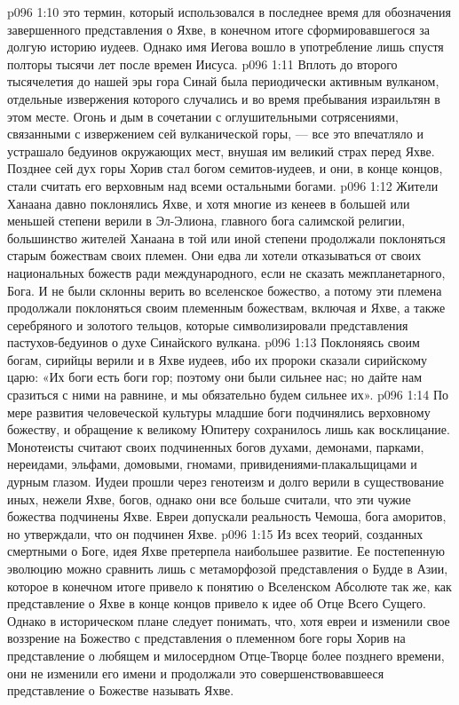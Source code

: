 \vs p096 1:10 \pc {} это термин, который использовался в последнее время для обозначения завершенного представления о Яхве, в конечном итоге сформировавшегося за долгую историю иудеев. Однако имя Иегова вошло в употребление лишь спустя полторы тысячи лет после времен Иисуса.
\vs p096 1:11 \pc Вплоть до второго тысячелетия до нашей эры гора Синай была периодически активным вулканом, отдельные извержения которого случались и во время пребывания израильтян в этом месте. Огонь и дым в сочетании с оглушительными сотрясениями, связанными с извержением сей вулканической горы, --- все это впечатляло и устрашало бедуинов окружающих мест, внушая им великий страх перед Яхве. Позднее сей дух горы Хорив стал богом семитов\hyp{}иудеев, и они, в конце концов, стали считать его верховным над всеми остальными богами.
\vs p096 1:12 Жители Ханаана давно поклонялись Яхве, и хотя многие из кенеев в большей или меньшей степени верили в Эл\hyp{}Элиона, главного бога салимской религии, большинство жителей Ханаана в той или иной степени продолжали поклоняться старым божествам своих племен. Они едва ли хотели отказываться от своих национальных божеств ради международного, если не сказать межпланетарного, Бога. И не были склонны верить во вселенское божество, а потому эти племена продолжали поклоняться своим племенным божествам, включая и Яхве, а также серебряного и золотого тельцов, которые символизировали представления пастухов\hyp{}бедуинов о духе Синайского вулкана.
\vs p096 1:13 Поклоняясь своим богам, сирийцы верили и в Яхве иудеев, ибо их пророки сказали сирийскому царю: «Их боги есть боги гор; поэтому они были сильнее нас; но дайте нам сразиться с ними на равнине, и мы обязательно будем сильнее их».
\vs p096 1:14 По мере развития человеческой культуры младшие боги подчинялись верховному божеству, и обращение к великому Юпитеру сохранилось лишь как восклицание. Монотеисты считают своих подчиненных богов духами, демонами, парками, нереидами, эльфами, домовыми, гномами, привидениями\hyp{}плакальщицами и дурным глазом. Иудеи прошли через генотеизм и долго верили в существование иных, нежели Яхве, богов, однако они все больше считали, что эти чужие божества подчинены Яхве. Евреи допускали реальность Чемоша, бога аморитов, но утверждали, что он подчинен Яхве.
\vs p096 1:15 Из всех теорий, созданных смертными о Боге, идея Яхве претерпела наибольшее развитие. Ее постепенную эволюцию можно сравнить лишь с метаморфозой представления о Будде в Азии, которое в конечном итоге привело к понятию о Вселенском Абсолюте так же, как представление о Яхве в конце концов привело к идее об Отце Всего Сущего. Однако в историческом плане следует понимать, что, хотя евреи и изменили свое воззрение на Божество с представления о племенном боге горы Хорив на представление о любящем и милосердном Отце\hyp{}Творце более позднего времени, они не изменили его имени и продолжали это совершенствовавшееся представление о Божестве называть Яхве.
